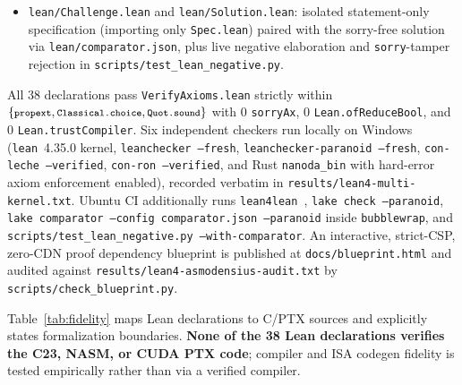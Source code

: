 \documentclass[11pt,reqno]{amsart}
\newcommand{\code}[1]{\texttt{\footnotesize #1}}
\newcommand{\us}{\_\allowbreak}
\newcommand{\slsh}{/\allowbreak}
\begin{document}
\begin{itemize}[leftmargin=1.8em,itemsep=2pt]
  \item \code{lean\slsh Challenge.lean} and \code{lean\slsh Solution.lean}: isolated statement-only specification (importing only \code{Spec.lean}) paired with the sorry-free solution via \code{lean\slsh comparator.json}, plus live negative elaboration and \code{sorry}-tamper rejection in \code{scripts\slsh test\us lean\us negative.py}.
\end{itemize}

All $38$ declarations pass \code{VerifyAxioms.lean} strictly within $\{\code{propext}, \code{Classical.choice}, \code{Quot.sound}\}$ with $0$ \code{sorryAx}, $0$ \code{Lean.ofReduceBool}, and $0$ \code{Lean.trustCompiler}. Six independent checkers run locally on Windows (\code{lean}~4.35.0 kernel, \code{leanchecker --fresh}, \code{leanchecker-paranoid --fresh}, \code{con-leche --verified}, \code{con-ron --verified}, and Rust \code{nanoda\us bin} with hard-error axiom enforcement enabled), recorded verbatim in \code{results\slsh lean4-multi-kernel.txt}. Ubuntu CI additionally runs \code{lean4lean}~\cite{carneiro2024lean4lean}, \code{lake check --paranoid}, \code{lake comparator --config comparator.json --paranoid} inside \code{bubblewrap}, and \code{scripts\slsh test\us lean\us negative.py --with-comparator}. An interactive, strict-CSP, zero-CDN proof dependency blueprint is published at \code{docs\slsh blueprint.html} and audited against \code{results\slsh lean4-asmodensius-audit.txt} by \code{scripts\slsh check\us blueprint.py}.

Table~\ref{tab:fidelity} maps Lean declarations to C/PTX sources and explicitly states formalization boundaries. \textbf{None of the 38 Lean declarations verifies the C23, NASM, or CUDA PTX code}; compiler and ISA codegen fidelity is tested empirically rather than via a verified compiler.
\end{document}
